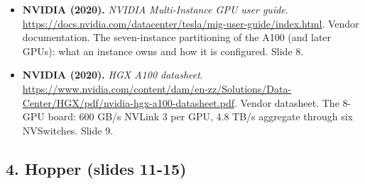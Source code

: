 \begin{itemize}[leftmargin=1.2em,itemsep=3pt]
\item \textbf{NVIDIA (2020).} \textit{NVIDIA Multi-Instance GPU user guide}. \url{https://docs.nvidia.com/datacenter/tesla/mig-user-guide/index.html}. Vendor documentation. The seven-instance partitioning of the A100 (and later GPUs): what an instance owns and how it is configured. Slide 8.
\item \textbf{NVIDIA (2020).} \textit{HGX A100 datasheet}. \url{https://www.nvidia.com/content/dam/en-zz/Solutions/Data-Center/HGX/pdf/nvidia-hgx-a100-datasheet.pdf}. Vendor datasheet. The 8-GPU board: 600 GB/s NVLink 3 per GPU, 4.8 TB/s aggregate through six NVSwitches. Slide 9.
\end{itemize}
\subsection*{4. Hopper (slides 11-15)}
